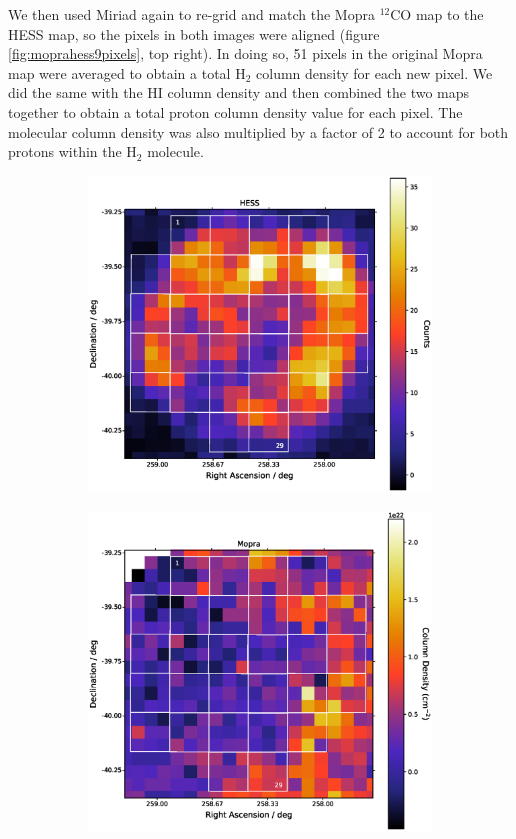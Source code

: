 \documentclass[12pt,a4paper]{article}
\begin{document}
We then used Miriad again to re-grid and match the Mopra $^{12}$CO map to the HESS map, so the pixels in both images were aligned (figure \ref{fig:moprahess9pixels}, top right).
In doing so, 51 pixels in the original Mopra map were averaged to obtain a total H$_2$ column density for each new pixel. 
We did the same with the HI column density and then combined the two maps together to obtain a total proton column density value for each pixel. 
The molecular column density was also multiplied by a factor of 2 to account for both protons within the H$_2$ molecule. 
\begin{figure}[H]
	\begin{subfigure}{0.5\textwidth}
		\centering
		\includegraphics[width=.9\linewidth, height=0.25\textheight]{rxj1713_9regrid_HESS}
	\end{subfigure}
	\begin{subfigure}{0.5\textwidth}
		\centering
		\includegraphics[width=0.9\linewidth, height=0.25\textheight]{rxj1713_9regrid_Mopra}

\end{subfigure}
\end{figure}
\end{document}
